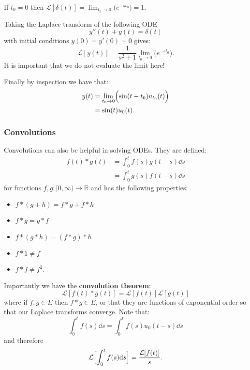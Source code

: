 \documentclass{article}
\begin{document}
If $t_0=0$ then
$\displaystyle\mathcal{L}[\delta(t)]
=\lim_{t_0\rightarrow0}
\bigl(e^{-st_0}\bigr)=1$.

\newpage

Taking the Laplace transform of the following ODE
$$y''(t)+y(t)=\delta(t)$$
with initial conditions $y(0)=y'(0)=0$ gives:
$$\mathcal{L}[y(t)]
=\frac{1}{s^2+1}
\lim_{t_0\rightarrow0}\bigl(
e^{-s t_0}
\bigr).$$
It is important that we do not evaluate the limit here!

Finally by inspection we have that:
\begin{align*}
    y(t)
    &=\lim_{t_0\rightarrow0}
    \Bigl(\sin(t-t_0)u_{t_0}(t)\Bigr) \\
    &=\sin(t)u_0(t).
\end{align*}

\subsubsection{Convolutions}
Convolutions can also be helpful in solving ODEs.
They are defined:
\begin{align*}
    f(t)*g(t)
    &=\int_{0}^{t}f(s)g(t-s)\dd s \\
    &=\int_{0}^{t}g(s)f(t-s)\dd s
\end{align*}
for functions $f,g:[0,\infty)\rightarrow\mathbb{R}$
and has the following properties:
\begin{itemize}
    \item $f*(g+h)=f*g+f*h$
    \item $f*g=g*f$
    \item $f*(g*h)=(f*g)*h$
    \item $f*1\neq f$
    \item $f*f\neq f^2$.
\end{itemize}
Importantly we have the \textbf{convolution theorem}:
$$\mathcal{L}[f(t)*g(t)]=\mathcal{L}[f(t)]\mathcal{L}[g(t)]$$
where if $f,g\in E$ then $f*g\in E$, or that they
are functions of exponential order so that our Laplace
transforms converge. Note that:
$$\int_{0}^{t}f(s)\dd s
=\int_{0}^{t}f(s)u_0(t-s)\dd s$$
and therefore
$$\mathcal{L}\Bigl[
\int_{0}^{t}f(s)\dd s
\Bigr]=\frac{\mathcal{L}[f(t)]}{s}.$$

\newpage
\end{document}
